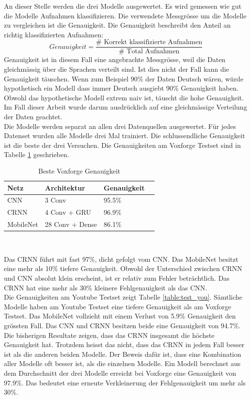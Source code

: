 An dieser Stelle werden die drei Modelle ausgewertet. Es wird gemessen wie gut die Modelle Aufnahmen klassifizieren. Die verwendete Messgrösse um die Modelle zu vergleichen ist die Genauigkeit. Die Genauigkeit beschreibt den Anteil an richtig klassifizierten Aufnahmen:
$$Genauigkeit = \frac{\# \text{ Korrekt klassifizierte Aufnahmen}}{\# \text{ Total Aufnahmen}}$$
Genauigkeit ist in diesem Fall eine angebrachte Messgrösse, weil die Daten gleichmässig über die Sprachen verteilt sind. Ist dies nicht der Fall kann die Genauigkeit täuschen. Wenn zum Beispiel 90\% der Daten Deutsch wären, würde hypothetisch ein Modell dass immer Deutsch ausgiebt 90\% Genauigkeit haben. Obwohl das hypothetische Modell extrem naiv ist, täuscht die hohe Genauigkeit. Im Fall dieser Arbeit wurde darum ausdrücklich auf eine gleichmässige Verteilung der Daten geachtet.
\\ 
Die Modelle werden separat an allen drei Datenquellen ausgewertet. Für jedes Datenset wurden alle Modelle drei Mal trainiert. Die schlussendliche Genauigkeit ist die beste der drei Versuchen. Die Genauigkeiten am Voxforge Testset sind in Tabelle \ref{table:test_vox} geschrieben.
\begin{table}[h]
	\centering
	\begin{tabular}{llll}
		\hline
		Netz & Architektur     & Genauigkeit \\ \hline
		CNN  & 3 Conv          & 95.5\%      \\
		CRNN & 4 Conv + GRU   & 96.9\%       \\
		MobileNet  & 28 Conv + Dense & 86.1\%       \\ \hline
	\end{tabular} \\
	\caption{Beste Voxforge Genauigkeit}
	\label{table:test_vox}
\end{table}
Das CRNN führt mit fast 97\%, dicht gefolgt vom CNN. Das MobileNet besitzt eine mehr als 10\% tiefere Genauigkeit. Obwohl der Unterschied zwischen CRNN und CNN absolut klein erscheint, ist er relativ zum Fehler beträchtlich. Das CRNN hat eine mehr als 30\% kleinere Fehlgenauigkeit als das CNN.
\\ 
Die Genauigkeiten am Youtube Testset zeigt Tabelle \ref{table:test_you}. Sämtliche Modelle haben am Youtube Testset eine tiefere Genauigkeit als am Voxforge Testset. Das MobileNet vollzieht mit einem Verlust von 5.9\% Genauigkeit den grössten Fall. Das CNN und CRNN besitzen beide eine Genauigkeit von 94.7\%.
\\
Die bisherigen Resultate zeigen, dass das CRNN insgesamt die höchste Genauigkeit hat. Trotzdem heisst das nicht, dass das CRNN in jedem Fall besser ist als die anderen beiden Modelle. Der Beweis dafür ist, dass eine Kombination aller Modelle oft besser ist, als die einzelnen Modelle. Ein Modell berechnet aus dem Durchschnitt der drei Modelle erreicht bei Voxforge eine Genauigkeit von 97.9\%. Das bedeutet eine erneute Verkleinerung der Fehlgenauigkeit um mehr als 30\%.
